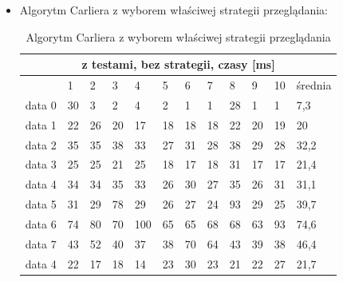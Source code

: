 \documentclass[11pt]{article}
\begin{document}
\begin{itemize}
\item  Algorytm Carliera z wyborem właściwej strategii przeglądania:\\
\begin{table}[ht!]
\centering
\label{my-label}
\begin{tabular}{|l|l|l|l|l|l|l|l|l|l|l|l|}
\hline
\multicolumn{12}{|c|}{z testami, bez strategii, czasy {[}ms{]}}           \\ \hline
       & 1  & 2  & 3  & 4   & 5  & 6  & 7  & 8  & 9  & 10 & średnia \\ \hline
data 0 & 30 & 3  & 2  & 4   & 2  & 1  & 1  & 28 & 1  & 1  & 7,3     \\ \hline
data 1 & 22 & 26 & 20 & 17  & 18 & 18 & 18 & 22 & 20 & 19 & 20      \\ \hline
data 2 & 35 & 35 & 38 & 33  & 27 & 31 & 28 & 38 & 29 & 28 & 32,2    \\ \hline
data 3 & 25 & 25 & 21 & 25  & 18 & 17 & 18 & 31 & 17 & 17 & 21,4    \\ \hline
data 4 & 34 & 34 & 35 & 33  & 26 & 30 & 27 & 35 & 26 & 31 & 31,1    \\ \hline
data 5 & 31 & 29 & 78 & 29  & 26 & 27 & 24 & 93 & 29 & 25 & 39,7    \\ \hline
data 6 & 74 & 80 & 70 & 100 & 65 & 65 & 68 & 68 & 63 & 93 & 74,6    \\ \hline
data 7 & 43 & 52 & 40 & 37  & 38 & 70 & 64 & 43 & 39 & 38 & 46,4    \\ \hline
data 4 & 22 & 17 & 18 & 14  & 23 & 30 & 23 & 21 & 22 & 27 & 21,7    \\ \hline
\end{tabular}
 \caption{Algorytm Carliera z wyborem właściwej strategii przeglądania}
\end{table}
\end{itemize}
\newpage
\end{document}
